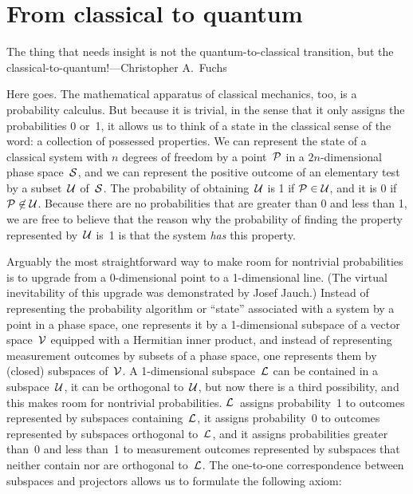 \documentclass[smallextended]{svjour3}
\newcommand{\cP}{{\cal P}}
\newcommand{\cS}{{\cal S}}
\newcommand{\cU}{{\cal U}}
\newcommand{\cL}{{\cal L}}
\newcommand{\cV}{{\cal V}}
\begin{document}
\section{From classical to quantum}\label{sec.cq}
{\leftskip\parindent\small The thing that needs insight is not the quantum-to-classical transition, but the classical-to-quantum!---Christopher A.\ Fuchs\cite{FuchsPeri}\par}\medskip

\noindent Here goes. The mathematical apparatus of classical mechanics, too, is a probability calculus. But because it is trivial, in the sense that it only assigns the probabilities 0 or~1,  it allows us to think of a state in the classical sense of the word: a collection of possessed properties. We can represent the state of a classical system with $n$ degrees of freedom by a point~$\cP$ in a $2n$-dimensional phase space~$\cS$, and we can represent the positive outcome of an elementary test by a subset~$\cU$ of~$\cS$. The probability of obtaining~$\cU$ is 1 if $\cP\in\cU$, and it is 0 if $\cP\not\in\cU$. Because there are no probabilities that are greater than 0 and less than 1, we are free to believe that the reason why the probability of finding the property represented by~$\cU$ is~1 is that the system \emph{has} this property.

Arguably the most straightforward way to make room for nontrivial probabilities is to upgrade from a 0-dimensional point to a 1-dimensional line.\cite{Mohrhoff-QMexplained} (The virtual inevitability of this upgrade was demonstrated by Josef Jauch.\cite{Jauch}) Instead of representing the probability algorithm or ``state'' associated with a system by a point in a phase space, one represents it by a 1-dimensional subspace of a vector space~$\cV$ equipped with a Hermitian inner product, and instead of representing measurement outcomes by subsets of a phase space, one represents them by (closed) subspaces of~$\cV$. A {1-dimensional} subspace~$\cL$ can be contained in a subspace~$\cU$, it can be orthogonal to~$\cU$, but now there is a third possibility, and this makes room for nontrivial probabilities. $\cL$~assigns probability~1 to outcomes represented by subspaces containing~$\cL$, it assigns probability~0 to outcomes represented by subspaces orthogonal to~$\cL$, and it assigns probabilities greater than~0 and less than~1 to measurement outcomes represented by subspaces that neither contain nor are orthogonal to~$\cL$. The one-to-one correspondence between subspaces and projectors allows us to formulate the following axiom:
\end{document}

